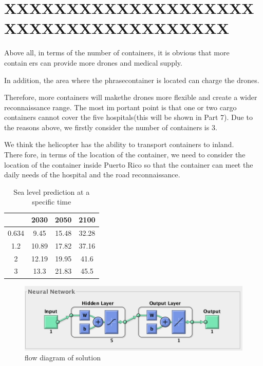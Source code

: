 \documentclass[12pt]{article}  %
\begin{document}


\section{XXXXXXXXXXXXXXXXXXXXXXXXXXXXXXXXXXXXXX}

Above all, in terms of the number of containers, it is obvious that more containers can provide more drones and medical supply. 

In addition, the area where the phrasecontainer is located can charge the drones. 
	
	Therefore, more containers will makethe drones more flexible and create a wider reconnaissance range. The most important point is that one or two cargo containers cannot cover the five hospitals(this will be shown in Part 7). Due to the reasons above, we firstly consider the
	number of containers is 3.
	
	We think the helicopter has the ability to transport containers to inland. Therefore, in terms of the location of the container, we need to consider the location of the container inside Puerto Rico so that the container can meet the daily needs of
	the hospital and the road reconnaissance.


\begin{table}[htbp]
	\centering
	\caption{Sea level prediction at a specific time}
	\begin{tabular}{c|ccc}
		\toprule
		\kappa     & 2030  & 2050  & 2100 \\
		\midrule
		0.634 & 9.45  & 15.48 & 32.28 \\
		1.2   & 10.89 & 17.82 & 37.16 \\
		2     & 12.19 & 19.95 & 41.6 \\
		3     & 13.3  & 21.83 & 45.5 \\
		\bottomrule
	\end{tabular}%
	\label{tab:addlabel}%
\end{table}%





\begin{figure}[htbp]
	\centering
	\includegraphics[width=.6\textwidth]{p1.png}
	\caption{ flow diagram of solution}\label{fig: flow diagram of solution}
\end{figure}
\end{document}
